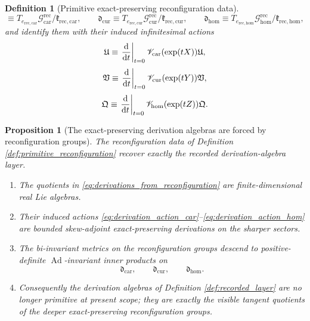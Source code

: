 \documentclass[11pt]{article}
\newcommand{\RootTensor}{\mathfrak U}
\newcommand{\RootRelabel}{\mathfrak V}
\newcommand{\RootFree}{\mathfrak Q}
\newcommand{\TensorDerAlg}{\mathfrak d_{\mathrm{car}}}
\newcommand{\CurDerAlg}{\mathfrak d_{\mathrm{cur}}}
\newcommand{\HomDerAlg}{\mathfrak d_{\mathrm{hom}}}
\newcommand{\TensorReconGroup}{\mathcal G_{\mathrm{car}}^{\mathrm{rec}}}
\newcommand{\CurReconGroup}{\mathcal G_{\mathrm{cur}}^{\mathrm{rec}}}
\newcommand{\HomReconGroup}{\mathcal G_{\mathrm{hom}}^{\mathrm{rec}}}
\newcommand{\TensorReconAct}{\mathscr V_{\mathrm{car}}}
\newcommand{\CurReconAct}{\mathscr V_{\mathrm{cur}}}
\newcommand{\HomReconAct}{\mathscr V_{\mathrm{hom}}}
\newtheorem{definition}{Definition}
\newtheorem{proposition}{Proposition}
\begin{document}
\begin{definition}[Primitive exact-preserving reconfiguration data]
\begin{equation}
\equiv
T_{e_{\mathrm{rec,car}}}\TensorReconGroup/\mathfrak k_{\mathrm{rec,car}},
\qquad
\CurDerAlg
\equiv
T_{e_{\mathrm{rec,cur}}}\CurReconGroup/\mathfrak k_{\mathrm{rec,cur}},
\qquad
\HomDerAlg
\equiv
T_{e_{\mathrm{rec,hom}}}\HomReconGroup/\mathfrak k_{\mathrm{rec,hom}},
\label{eq:derivations_from_reconfiguration}
\end{equation}
and identify them with their induced infinitesimal actions
\begin{equation}
[X]\RootTensor
\equiv
\eval{\dv{}{t}}_{t=0}\TensorReconAct(\exp(tX))\RootTensor,
\label{eq:derivation_action_car}
\end{equation}
\begin{equation}
[Y]\RootRelabel
\equiv
\eval{\dv{}{t}}_{t=0}\CurReconAct(\exp(tY))\RootRelabel,
\label{eq:derivation_action_cur}
\end{equation}
\begin{equation}
[Z]\RootFree
\equiv
\eval{\dv{}{t}}_{t=0}\HomReconAct(\exp(tZ))\RootFree.
\label{eq:derivation_action_hom}
\end{equation}
\end{definition}

\begin{proposition}[The exact-preserving derivation algebras are forced by reconfiguration groups]
\label{prop:derivations_from_reconfiguration}
The reconfiguration data of Definition \ref{def:primitive_reconfiguration} recover exactly the recorded derivation-algebra layer.
\begin{enumerate}
    \item The quotients in \eqref{eq:derivations_from_reconfiguration} are finite-dimensional real Lie algebras.
    \item Their induced actions \eqref{eq:derivation_action_car}--\eqref{eq:derivation_action_hom} are bounded skew-adjoint exact-preserving derivations on the sharper sectors.
    \item The bi-invariant metrics on the reconfiguration groups descend to positive-definite \(\operatorname{Ad}\)-invariant inner products on
    \[
    \TensorDerAlg,\qquad
    \CurDerAlg,\qquad
    \HomDerAlg.
    \]
    \item Consequently the derivation algebras of Definition \ref{def:recorded_layer} are no longer primitive at present scope; they are exactly the visible tangent quotients of the deeper exact-preserving reconfiguration groups.
\end{enumerate}
\end{proposition}
\end{document}
